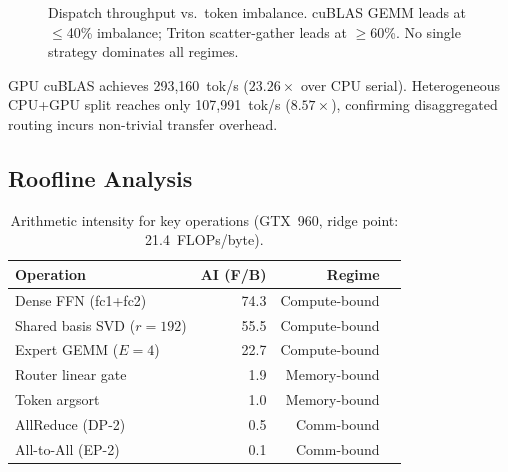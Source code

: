 \documentclass[conference]{IEEEtran}
\begin{document}
\begin{figure}[htbp]
\centering
{}
\caption{Dispatch throughput vs.\ token imbalance. cuBLAS GEMM leads at
$\leq$40\% imbalance; Triton scatter-gather leads at $\geq$60\%.
No single strategy dominates all regimes.}
\label{fig:dispatch}
\end{figure}

GPU cuBLAS achieves 293,160~tok/s ($23.26\times$ over CPU serial).
Heterogeneous CPU+GPU split reaches only 107,991~tok/s ($8.57\times$),
confirming disaggregated routing incurs non-trivial transfer overhead.

\subsection{Roofline Analysis}

\begin{table}[htbp]
\caption{Arithmetic intensity for key operations (GTX~960,
ridge point: 21.4~FLOPs/byte).}
\label{tab:roofline}
\centering
\scriptsize
\begin{tabular}{lrrl}
\toprule
\textbf{Operation} & \textbf{AI (F/B)} & \textbf{Regime} \\
\midrule
Dense FFN (fc1+fc2)      & 74.3 & Compute-bound \\
Shared basis SVD ($r{=}192$) & 55.5 & Compute-bound \\
Expert GEMM ($E{=}4$)    & 22.7 & Compute-bound \\
Router linear gate       & 1.9  & Memory-bound \\
Token argsort            & 1.0  & Memory-bound \\
AllReduce (DP-2)         & 0.5  & Comm-bound \\
All-to-All (EP-2)        & 0.1  & Comm-bound \\
\bottomrule
\end{tabular}
\end{table}
\end{document}
